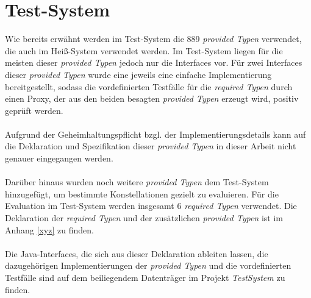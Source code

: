 \section{Test-System}\label{sec_testsystem}
Wie bereits erwähnt werden im Test-System die 889 \emph{provided Typen} verwendet, die auch im Heiß-System verwendet werden. Im Test-System liegen für die meisten dieser \emph{provided Typen} jedoch nur die Interfaces vor. Für zwei Interfaces dieser \emph{provided Typen} wurde eine jeweils eine einfache Implementierung bereitgestellt, sodass die vordefinierten Testfälle für die \emph{required Typen} durch einen Proxy, der aus den beiden besagten \emph{provided Typen} erzeugt wird, positiv geprüft werden.
\\\\
Aufgrund der Geheimhaltungspflicht bzgl. der Implementierungsdetails kann auf die Deklaration und Spezifikation dieser \emph{provided Typen} in dieser Arbeit nicht genauer eingegangen werden.
\\\\
Darüber hinaus wurden noch weitere \emph{provided Typen} dem Test-System hinzugefügt, um bestimmte Konstellationen gezielt zu evaluieren. Für die Evaluation im Test-System werden insgesamt 6 \emph{required Typen} verwendet. Die Deklaration der \emph{required Typen} und der zusätzlichen \emph{provided Typen} ist im Anhang \ref{xyz} zu finden.  
\\\\
Die Java-Interfaces, die sich aus dieser Deklaration ableiten lassen, die dazugehörigen Implementierungen der \emph{provided Typen} und die vordefinierten Testfälle sind auf dem beiliegendem Datenträger im Projekt \emph{TestSystem} zu finden.
%
%
%
